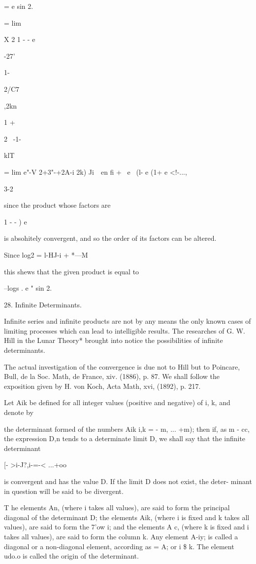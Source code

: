 = e sin 2.

= lim

X 2 1 - - e

 -27'

1-

2/C7

,2kn

1 +

2 \ -1-

klT

= lim e"-V 2+3"-+2A-i 2k) Ji\ \ en fi + \ e~ (l- e (1+ e <!-...,

3-2

%
%

since the product whose factors are

1 - - ) e

is absohitely convergent, and so the order of its factors can be
altered.

Since log2 = l-HJ-i + *---M

this shews that the given product is equal to

--logs . e " sin 2.

28. Infinite Determinants.

Infinite series and infinite products are not by any means the only
known cases of limiting processes which can lead to intelligible
results. The researches of G. W. Hill in the Lunar Theory* brought
into notice the possibilities of infinite determinants.

The actual investigation of the convergence is due not to Hill but to
Poincare, Bull, de la Soc. Math, de France, xiv. (1886), p. 87. We
shall follow the exposition given by H. von Koch, Acta Math, xvi,
(1892), p. 217.

Let Aik be defined for all integer values (positive and negative) of
i, k, and denote by

the determinant formed of the numbers Aik i,k = - m, ... +m); then if,
as m - cc, the expression D,n tends to a determinate limit D, we
shall say that the infinite determinant

[- >i-J?,i-=-< ...+oo

is convergent and has the value D. If the limit D does not exist, the
deter- minant in question will be said to be divergent.

T he elements An, (where i takes all values), are said to form the
principal diagonal of the determinant D; the elements Aik, (where i is
fixed and k takes all values), are said to form the 7'ow i; and the
elements A c, (where k is fixed and i takes all values), are said to
form the column k. Any element A-iy; is called a diagonal or a
non-diagonal element, according as = A; or i \$ k. The element udo.o
is called the origin of the determinant.


